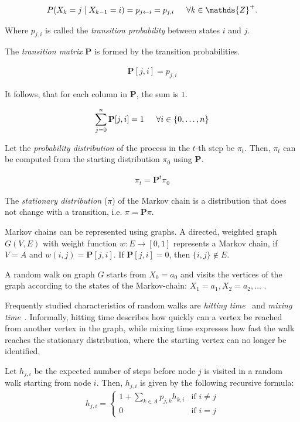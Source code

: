 \begin{align*}
P(X_k = j \mid X_{k-1} = i) = p_{j\leftarrow{}i} = p_{j,i} \addspace \forall k \in \mathds{Z}^+.
\end{align*}

Where $p_{j,i}$ is called the \textit{transition probability} between states $i$ and $j$.

The \textit{transition matrix} $\mathbf{P}$ is formed by the transition probabilities.

\begin{align*}
    \mathbf{P}[j,i] = p_{j,i} 
\end{align*}

It follows, that for each column in $\mathbf{P}$, the sum is $1$.

\begin{align*}
    \sum\limits_{j=0}^{n}\mathbf{P}[j,i] = 1 \hspace{15pt} \forall i \in \{0,\dots,n\}
\end{align*}

Let the \textit{probability distribution} of the process in the $t$-th step be $\pi_t$. Then, $\pi_t$ can be computed from the starting distribution $\pi_0$ using $\mathbf{P}$.

\begin{align*}
\pi_{t} = \mathbf{P}^t\pi_{0}
\end{align*}

The \textit{stationary distribution} ($\pi$) of the Markov chain is a distribution that does not change with a transition, i.e. $\pi = \mathbf{P}\pi$.

Markov chains can be represented using graphs. A directed, weighted graph $G(V,E)$ with weight function $w:E\rightarrow{}[0,1]$ represents a Markov chain, if $V=A$ and $w(i,j) = \mathbf{P}[j,i]$. If $\mathbf{P}[j,i] = 0$, then $\{i,j\} \not\in E$.

A random walk on graph $G$ starts from $X_0 = a_0$ and visits the vertices of the graph according to the states of the Markov-chain: $X_1 = a_1, X_2 = a_2, \dots$ .

Frequently studied characteristics of random walks are \textit{hitting time}~\cite{XiaReview} and \textit{mixing time}~\cite{MitzenmacherProbability}. Informally, hitting time describes how quickly can a vertex be reached from another vertex in the graph, while mixing time expresses how fast the walk reaches the stationary distribution, where the starting vertex can no longer be identified.

\begin{definition} Let $h_{j,i}$ be the expected number of steps before node $j$ is visited in a random walk starting from node $i$.
Then, $h_{j,i}$ is given by the following recursive formula:
\begin{align*}
    h_{j,i} = \left\{
        \begin{array}{lr}
            1 + \sum\limits_{k\in{}A}p_{j,k}h_{k,i} & \text{if } i\neq{}j\\
            0 & \text{if } i=j
        \end{array}
    \right.
\end{align*}
\end{definition}


